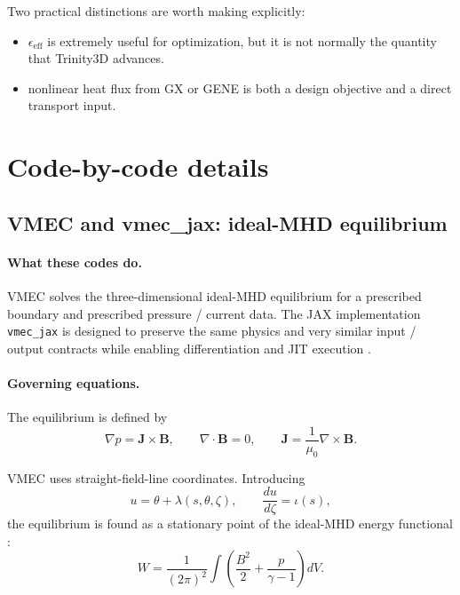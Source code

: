 \documentclass[11pt]{article}
\begin{document}
Two practical distinctions are worth making explicitly:

\begin{itemize}
  \item $\epsilon_{\mathrm{eff}}$ is extremely useful for optimization, but it is not normally the quantity that Trinity3D advances.
  \item nonlinear heat flux from GX or GENE is both a design objective and a direct transport input.
\end{itemize}

\section{Code-by-code details}

\subsection{VMEC and vmec\_jax: ideal-MHD equilibrium}

\paragraph{What these codes do.}
VMEC solves the three-dimensional ideal-MHD equilibrium for a prescribed
boundary and prescribed pressure / current data. The JAX implementation
\texttt{vmec\_jax} is designed to preserve the same physics and very similar
input / output contracts while enabling differentiation and JIT execution
\citep{VMECRepo,VMECJaxRepo}.

\paragraph{Governing equations.}
The equilibrium is defined by
\begin{equation}
\nabla p = \mathbf{J}\times\mathbf{B},
\qquad
\nabla\cdot\mathbf{B}=0,
\qquad
\mathbf{J}=\frac{1}{\mu_0}\nabla\times\mathbf{B}.
\end{equation}

VMEC uses straight-field-line coordinates. Introducing
\begin{equation}
u = \theta + \lambda(s,\theta,\zeta),
\qquad
\frac{du}{d\zeta} = \iota(s),
\end{equation}
the equilibrium is found as a stationary point of the ideal-MHD energy
functional \citep{HirshmanWhitson1983}:
\begin{equation}
W = \frac{1}{(2\pi)^2}\int \left(\frac{B^2}{2} + \frac{p}{\gamma-1}\right)dV.
\end{equation}
\end{document}
